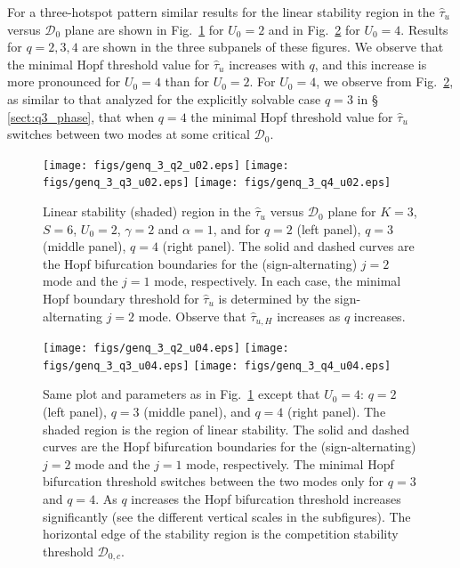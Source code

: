 \documentclass{article}%
\begin{document}
For a three-hotspot pattern similar results for the linear stability
region in the $\hat{\tau}_u$ versus ${\mathcal D}_0$ plane are shown
in Fig.~\ref{fig:genq:k3:hopf_tau_U02} for $U_0=2$ and in
Fig.~\ref{fig:genq:k3:hopf_tau_U04} for $U_0=4$. Results for $q=2,3,4$
are shown in the three subpanels of these figures. We observe that the
minimal Hopf threshold value for $\hat{\tau}_u$ increases with $q$,
and this increase is more pronounced for $U_0=4$ than for $U_0=2$. For
$U_0=4$, we observe from Fig.~\ref{fig:genq:k3:hopf_tau_U04}, as
similar to that analyzed for the explicitly solvable case $q=3$ in \S
\ref{sect:q3_phase}, that when $q=4$ the minimal Hopf threshold value
for $\hat{\tau}_u$ switches between two modes at some critical ${\mathcal
  D}_0$.

\begin{figure}[htbp]
\centering
\texttt{[image: figs/genq\_3\_q2\_u02.eps]}
\texttt{[image: figs/genq\_3\_q3\_u02.eps]}
\texttt{[image: figs/genq\_3\_q4\_u02.eps]}
\caption{\label{fig:genq:k3:hopf_tau_U02} Linear stability (shaded)
  region in the $\hat{\tau}_u$ versus ${\mathcal D}_0$ plane for
  $K=3$, $S=6$, $U_0=2$, $\gamma=2$ and $\alpha=1$, and for $q=2$ (left panel),
  $q=3$ (middle panel), $q=4$ (right panel). The solid and dashed
  curves are the Hopf bifurcation boundaries for the
  (sign-alternating) $j=2$ mode and the $j=1$ mode, respectively. In
  each case, the minimal Hopf boundary threshold for $\hat{\tau}_u$ is
  determined by the sign-alternating $j=2$ mode. Observe that
  $\hat{\tau}_{u,H}$ increases as $q$ increases.}
\end{figure}

\begin{figure}[htbp]
\centering
\texttt{[image: figs/genq\_3\_q2\_u04.eps]}
\texttt{[image: figs/genq\_3\_q3\_u04.eps]}
\texttt{[image: figs/genq\_3\_q4\_u04.eps]}
\caption{\label{fig:genq:k3:hopf_tau_U04} Same plot and parameters as
  in Fig.~\ref{fig:genq:k3:hopf_tau_U02} except that $U_0=4$: $q=2$
  (left panel), $q=3$ (middle panel), and $q=4$ (right panel). The
  shaded region is the region of linear stability. The solid and
  dashed curves are the Hopf bifurcation boundaries for the
  (sign-alternating) $j=2$ mode and the $j=1$ mode, respectively. The
  minimal Hopf bifurcation threshold switches between the two modes
  only for $q=3$ and $q=4$. As $q$ increases the Hopf bifurcation
  threshold increases significantly (see the different vertical scales
  in the subfigures). The horizontal edge of the stability region is the
  competition stability threshold ${\mathcal D}_{0,c}$.}
\end{figure}
\end{document}
